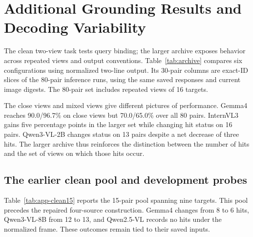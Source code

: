 \section{Additional Grounding Results and Decoding Variability}
\label{app:archive}

The clean two-view task tests query binding; the larger archive exposes
behavior across repeated views and output conventions. Table~\ref{tab:archive}
compares six configurations using normalized two-line output. Its 30-pair
columns are exact-ID slices of the 80-pair inference runs, using the same saved
responses and current image digests. The 80-pair set includes repeated views
of 16 targets.

\begin{table}[htbp]
\centering\small
\setlength{\tabcolsep}{3pt}

\caption{Archived raster readout: end-to-end point hits (\%). Each pair of
columns reports Original then Converted. Differences and flips use all 80
pairs; all queries remain in the denominator.}
\label{tab:archive}
\end{table}

The close views and mixed views give different pictures of performance.
Gemma4 reaches 90.0/96.7\% on close views but 70.0/65.0\% over all 80 pairs.
InternVL3 gains five percentage points in the larger set while changing hit
status on 16 pairs. Qwen3-VL-2B changes status on 13 pairs despite a net decrease
of three hits. The larger archive thus reinforces the distinction between the
number of hits and the set of views on which those hits occur.

\subsection{The earlier clean pool and development probes}
Table~\ref{tab:app-clean15} reports the 15-pair pool spanning nine targets.
This pool precedes the repaired four-source construction. Gemma4 changes from
8 to 6 hits, Qwen3-VL-8B from 12 to 13, and Qwen2.5-VL records no hits under
the normalized frame. These outcomes remain tied to their saved inputs.

\begin{table}[htbp]
\centering\small

\caption{The 15-pair grounding pool under normalized two-line readout.
$V$ counts numeric outputs and $H$ counts hits, both over $N=15$ per condition.
Flips count paired changes in hit status.}
\label{tab:app-clean15}
\end{table}

